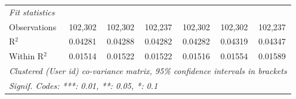 \begin{table}[htbp]
\begin{threeparttable}[b]
\begin{tabular}{lcccccc}
         \midrule
         \emph{Fit statistics}\\
         Observations               & 102,302              & 102,302              & 102,237              & 102,302              & 102,302              & 102,237\\  
         R$^2$                      & 0.04281              & 0.04288              & 0.04282              & 0.04282              & 0.04319              & 0.04347\\  
         Within R$^2$               & 0.01514              & 0.01522              & 0.01522              & 0.01516              & 0.01554              & 0.01589\\  
         \midrule \midrule
         \multicolumn{7}{l}{\emph{Clustered (User id) co-variance matrix, 95\% confidence intervals in brackets}}\\
         \multicolumn{7}{l}{\emph{Signif. Codes: ***: 0.01, **: 0.05, *: 0.1}}\\
      \end{tabular}
   \end{threeparttable}
\end{table}



